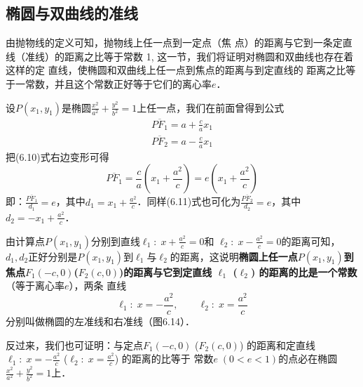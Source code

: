 \subsection{椭圆与双曲线的准线}
由抛物线的定义可知，抛物线上任一点到一定点（焦
点）的距离与它到一条定直线（准线）的距离之比等于常数
1, 这一节，我们将证明对椭圆和双曲线也存在着这样的定
直线，使椭圆和双曲线上任一点到焦点的距离与到定直线的
距离之比等于一常数，并且这个常数正好等于它们的离心率$e$．

设$P(x_1,y_1)$是椭圆$\frac{x^2}{a^2}+\frac{y^2}{b^2}=1$上任一点，我们在前面曾得到公式
\begin{align}
    \overline{PF_1}=a+\frac{c}{a}x_1\\
    \overline{PF_2}=a-\frac{c}{a}x_1
\end{align}
把(6.10)式右边变形可得
\[\overline{PF_1}=\frac{c}{a}\left(x_1+\frac{a^2}{c}\right)=e\left(x_1+\frac{a^2}{c}\right)\]
即：$\frac{\overline{PF_1}}{d_1}=e$，其中$d_1=x_1+\frac{a^2}{c}$．同样(6.11)式也可化为$\frac{\overline{PF_2}}{d_2}=e$，其中$d_2=-x_1+\frac{a^2}{c}$．

由计算点$P(x_1,y_1)$分别到直线$\ell_1:\; x+\frac{a^2}{c}=0$和
$\ell_2:\; x-\frac{a^2}{c}=0$的距离可知，$d_1,d_2$正好分别是$P(x_1,y_1)$到$\ell_1$与$\ell_2$的距离，这说明\textbf{椭圆上任一点$P(x_1,y_1)$到焦点$F_1(-c,0)$($F_2(c,0)$)的距离与它到定直线
$\ell_1$ ($\ell_2$) 的距离的比是一个常数}（等于离心率$e$），两条
直线
\[\ell_1:\; x=-\frac{a^2}{c},\qquad \ell_2:\; x=\frac{a^2}{c}\]
分别叫做椭圆的左准线和右准线（图6.14）．
\begin{figure}[htp]
    \centering
{}
    \caption{}
\end{figure}

反过来，我们也可证明：与定点$F_1(-c,0)$ ($F_2(c,0)$)
的距离和定直线$\ell_1:\; x=-\frac{a^2}{c}$ ($\ell_2:\; x=\frac{a^2}{c}$) 的距离的比等于
常数$e\; (0<e<1)$的点必在椭圆$\frac{x^2}{a^2}+\frac{y^2}{b^2}=1$上．

